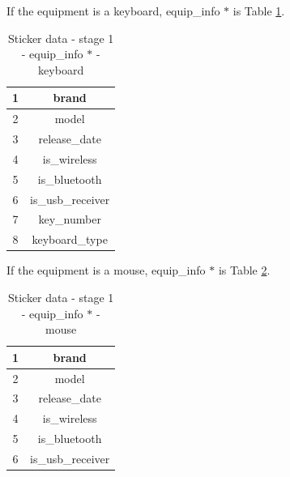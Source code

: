 \documentclass[a4paper,11pt]{article}
\begin{document}
\noindent If the equipment is a keyboard, equip\_info $*$ is Table \ref{table:sticker_data_stage_1_equip_info_keyboard}.
\begin{table}[h!]
	\begin{center}
		\begin{tabular}{ | c | c | }
			\hline
			1 & brand \\ 
			\hline
			2 & model  \\  
			\hline
			3 & release\_date \\
			\hline
			4 & is\_wireless \\ 
			\hline
			5 &  is\_bluetooth \\  
			\hline
			6 & is\_usb\_receiver \\
			\hline
			7 &  key\_number \\  
			\hline
			8 & keyboard\_type \\
			\hline
		\end{tabular}
		\caption{Sticker data \-- stage 1 \-- equip\_info $*$ \-- keyboard}
		\label{table:sticker_data_stage_1_equip_info_keyboard}
	\end{center}
\end{table}

\noindent If the equipment is a mouse, equip\_info $*$ is Table \ref{table:sticker_data_stage_1_equip_info_mouse}.
\begin{table}[H]
	\begin{center}
		\begin{tabular}{ | c | c | }
			\hline
			1 & brand \\ 
			\hline
			2 & model  \\  
			\hline
			3 & release\_date \\
			\hline
			4 & is\_wireless \\ 
			\hline
			5 &  is\_bluetooth \\  
			\hline
			6 & is\_usb\_receiver \\
			\hline
		\end{tabular}
		\caption{Sticker data \-- stage 1 \-- equip\_info $*$ \-- mouse}
		\label{table:sticker_data_stage_1_equip_info_mouse}
	\end{center}
\end{table}
\end{document}
